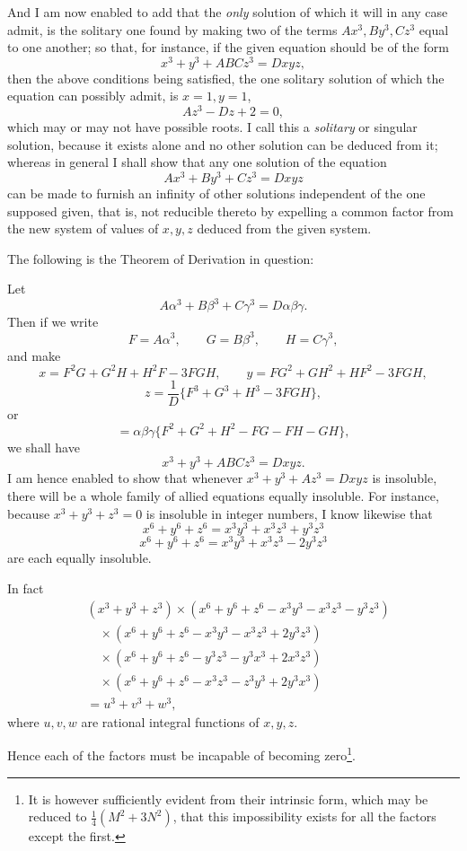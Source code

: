 \documentclass[11pt]{article}
\newcommand{\sourcepage}[1]{\marginpar{\scriptsize p.~#1}}
\begin{document}
{{\sourcepage{111}
And I am now enabled to add that the \emph{only} solution of which it will in any case admit, is the solitary one found by making two of the terms $Ax^3,By^3,Cz^3$ equal to one another; so that, for instance, if the given equation should be of the form
\[
x^3+y^3+ABCz^3=Dxyz,
\]
then the above conditions being satisfied, the one solitary solution of which the equation can possibly admit, is $x=1,y=1$,
\[
Az^3-Dz+2=0,
\]
which may or may not have possible roots. I call this a \emph{solitary} or singular solution, because it exists alone and no other solution can be deduced from it; whereas in general I shall show that any one solution of the equation
\[
Ax^3+By^3+Cz^3=Dxyz
\]
can be made to furnish an infinity of other solutions independent of the one supposed given, that is, not reducible thereto by expelling a common factor from the new system of values of $x,y,z$ deduced from the given system.

The following is the Theorem of Derivation in question:

Let
\[
A\alpha^3+B\beta^3+C\gamma^3=D\alpha\beta\gamma.
\]
Then if we write
\[
F=A\alpha^3,\qquad G=B\beta^3,\qquad H=C\gamma^3,
\]
and make
\[
x=F^2G+G^2H+H^2F-3FGH,
\qquad
y=FG^2+GH^2+HF^2-3FGH,
\]
\[
z=\frac{1}{D}\{F^3+G^3+H^3-3FGH\},
\]
or
\[
=\alpha\beta\gamma\{F^2+G^2+H^2-FG-FH-GH\},
\]
we shall have
\[
x^3+y^3+ABCz^3=Dxyz.
\]
I am hence enabled to show that whenever $x^3+y^3+Az^3=Dxyz$ is insoluble, there will be a whole family of allied equations equally insoluble. For instance, because $x^3+y^3+z^3=0$ is insoluble in integer numbers, I know likewise that
\[
x^6+y^6+z^6=x^3y^3+x^3z^3+y^3z^3
\]
\[
x^6+y^6+z^6=x^3y^3+x^3z^3-2y^3z^3
\]
are each equally insoluble.

\sourcepage{112}
In fact
\[
\begin{aligned}
&(x^3+y^3+z^3)\times(x^6+y^6+z^6-x^3y^3-x^3z^3-y^3z^3)\\
&\quad\times(x^6+y^6+z^6-x^3y^3-x^3z^3+2y^3z^3)\\
&\quad\times(x^6+y^6+z^6-y^3z^3-y^3x^3+2x^3z^3)\\
&\quad\times(x^6+y^6+z^6-x^3z^3-z^3y^3+2y^3x^3)\\
&=u^3+v^3+w^3,
\end{aligned}
\]
where $u,v,w$ are rational integral functions of $x,y,z$.

Hence each of the factors must be incapable of becoming zero\footnote{It is however sufficiently evident from their intrinsic form, which may be reduced to $\frac14(M^2+3N^2)$, that this impossibility exists for all the factors except the first.}.

}}
\end{document}
